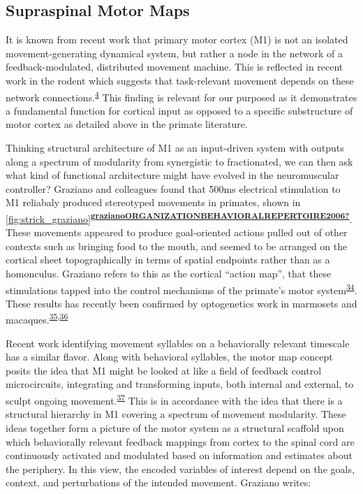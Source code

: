 \documentclass[
  a4paper,
]{article}
\begin{document}
\hypertarget{supraspinal-motor-maps}{%
\subsection{Supraspinal Motor Maps}\label{supraspinal-motor-maps}}

It is known from recent work that primary motor cortex (M1) is not an
isolated movement-generating dynamical system, but rather a node in the
network of a feedback-modulated, distributed movement machine. This is
reflected in recent work in the rodent which suggests that task-relevant
movement depends on these network
connections.\textsuperscript{\protect\hyperlink{ref-sauerbreiCorticalPatternGeneration2019}{4}}
This finding is relevant for our purposed as it demonstrates a
fundamental function for cortical input as opposed to a specific
substructure of motor cortex as detailed above in the primate
literature.

Thinking structural architecture of M1 as an input-driven system with
outputs along a spectrum of modularity from synergistic to fractionated,
we can then ask what kind of functional architecture might have evolved
in the neuromuscular controller? Graziano and colleagues found that
500ms electrical stimulation to M1 reliabaly produced stereotyped
movements in primates, shown in
\cref{fig:strick_graziano}\textsuperscript{\protect\hyperlink{ref-grazianoORGANIZATIONBEHAVIORALREPERTOIRE2006}{\textbf{grazianoORGANIZATIONBEHAVIORALREPERTOIRE2006?}}}.
These movements appeared to produce goal-oriented actions pulled out of
other contexts such as bringing food to the mouth, and seemed to be
arranged on the cortical sheet topographically in terms of spatial
endpoints rather than as a homonculus. Graziano refers to this as the
cortical ``action map'', that these stimulations tapped into the control
mechanisms of the primate's motor
system\textsuperscript{\protect\hyperlink{ref-grazianoIntelligentMovementMachine2009}{34}}.
These results has recently been confirmed by optogenetics work in
marmosets and
macaques.\textsuperscript{\protect\hyperlink{ref-ebina2019}{35},\protect\hyperlink{ref-watanabeForelimbMovementsEvoked2020}{36}}

Recent work identifying movement syllables on a behaviorally relevant
timescale has a similar flavor. Along with behavioral syllables, the
motor map concept posits the idea that M1 might be looked at like a
field of feedback control microcircuits, integrating and transforming
inputs, both internal and external, to sculpt ongoing
movement.\textsuperscript{\protect\hyperlink{ref-wiltschkoMappingSubSecondStructure2015}{37}}
This is in accordance with the idea that there is a structural hierarchy
in M1 covering a spectrum of movement modularity. These ideas together
form a picture of the motor system as a structural scaffold upon which
behaviorally relevant feedback mappings from cortex to the spinal cord
are continuously activated and modulated based on information and
estimates about the periphery. In this view, the encoded variables of
interest depend on the goals, context, and perturbations of the intended
movement. Graziano writes:
\end{document}
